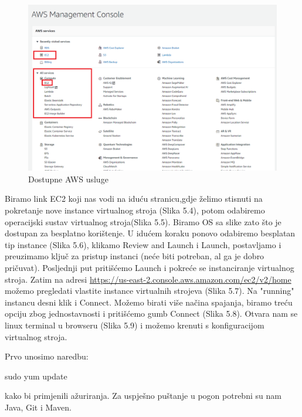 			\begin{figure}[h]
				\includegraphics[scale=0.5]{slike/deployment_slike/awshome.png}
				\centering
				\caption{Dostupne AWS usluge}
				
			\end{figure}
		
			Biramo link EC2  koji nas vodi na iduću stranicu,gdje želimo stisnuti na pokretanje nove instance virtualnog stroja (Slika 5.4), potom odabiremo operacijski sustav virtualnog stroja(Slika 5.5). Biramo OS sa slike zato što je dostupan za besplatno korištenje. U idućem koraku ponovo odabiremo besplatan tip instance (Slika 5.6), klikamo Review and Launch i Launch, postavljamo i preuzimamo ključ za pristup instanci (neće biti potreban, al ga je dobro pričuvat). Posljednji put pritišćemo Launch i pokreće se instanciranje virtualnog stroja. Zatim na adresi \url{https://us-east-2.console.aws.amazon.com/ec2/v2/home} možemo pregledati vlastite instance virtualnih strojeva (Slika 5.7). Na "running" instancu desni klik i Connect. Možemo birati više načina spajanja, biramo treću opciju zbog jednostavnosti i pritišćemo gumb Connect (Slika 5.8). Otvara nam se linux terminal u browseru (Slika 5.9) i možemo krenuti s konfiguracijom virtualnog stroja.
			
			
			\noindent Prvo unosimo naredbu:
			\begin{center}
				sudo yum update
			\end{center}
				kako bi primjenili ažuriranja. Za uspješno puštanje u pogon potrebni su nam Java, Git i Maven.
			
